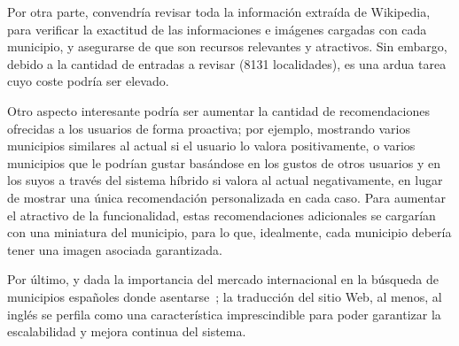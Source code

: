 Por otra parte, convendría revisar toda la información extraída de Wikipedia, para verificar la exactitud de las informaciones e imágenes cargadas con cada municipio, y asegurarse de que son recursos relevantes y atractivos. Sin embargo, debido a la cantidad de entradas a revisar (8131 localidades), es una ardua tarea cuyo coste podría ser elevado.

Otro aspecto interesante podría ser aumentar la cantidad de recomendaciones ofrecidas a los usuarios de forma proactiva; por ejemplo, mostrando varios municipios similares al actual si el usuario lo valora positivamente, o varios municipios que le podrían gustar basándose en los gustos de otros usuarios y en los suyos a través del sistema híbrido si valora al actual negativamente, en lugar de mostrar una única recomendación personalizada en cada caso. Para aumentar el atractivo de la funcionalidad, estas recomendaciones adicionales se cargarían con una miniatura del municipio, para lo que, idealmente, cada municipio debería tener una imagen asociada garantizada.

Por último, y dada la importancia del mercado internacional en la búsqueda de municipios españoles donde asentarse~\cite{extranjeros_1, extranjeros_2, extranjeros_3}; la traducción del sitio Web, al menos, al inglés se perfila como una característica imprescindible para poder garantizar la escalabilidad y mejora continua del sistema.